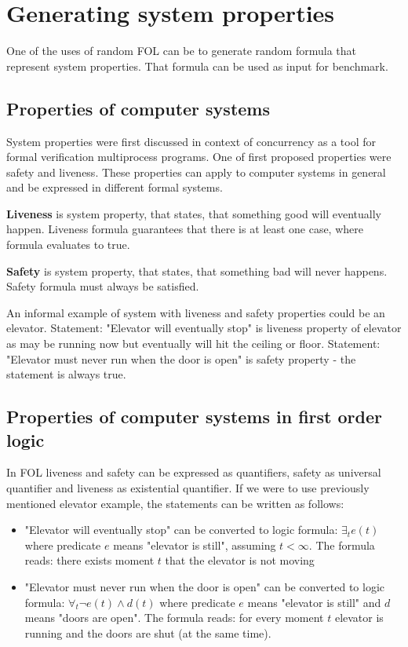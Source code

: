 \chapter{Generating system properties}
\label{chap:GeneratingSystemProperties}

One of the uses of random \gls{FOL} can be to generate random formula that represent system properties. That formula can be used as input for benchmark.

\section{Properties of computer systems}

System properties were first discussed in context of concurrency \cite{Lampert77} as a tool for formal verification multiprocess programs. One of first proposed properties were safety and liveness. These properties can apply to computer systems in general and be expressed in different formal systems.

\textbf{Liveness} \cite{Klimek99} is system property, that states, that something good will eventually happen.
Liveness formula guarantees that there is at least one case, where formula evaluates to true.

\textbf{Safety} \cite{Klimek99} is system property, that states, that something bad will never happens.
Safety formula must always be satisfied.

An informal example of system with liveness and safety properties could be an elevator. Statement: "Elevator will eventually stop" is liveness property of elevator as may be running now but eventually will hit the ceiling or floor. Statement: "Elevator must never run when the door is open" is safety property - the statement is always true.

\section{Properties of computer systems in first order logic}

In \gls{FOL} liveness and safety can be expressed as quantifiers, safety as universal quantifier and liveness as existential quantifier. 
If we were to use previously mentioned elevator example, the statements can be written as follows:

\begin{itemize}
  \item "Elevator will eventually stop" can be converted to logic formula: $\exists_t e(t)$ where predicate $e$ means "elevator is still", assuming $t<\infty$. The formula reads: there exists moment $t$ that the elevator is not moving
  \item "Elevator must never run when the door is open" can be converted to logic formula: $\forall_t \neg e(t) \land d(t)$ where predicate $e$ means "elevator is still" and $d$ means "doors are open". The formula reads: for every moment $t$ elevator is running and the doors are shut (at the same time).
\end{itemize}

